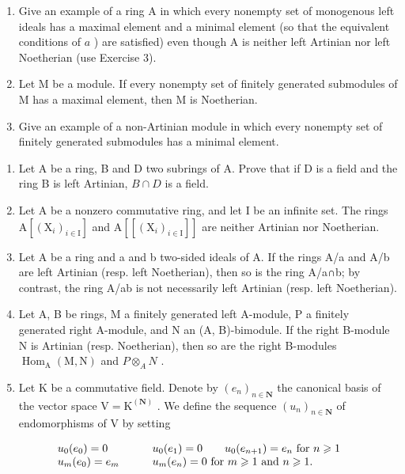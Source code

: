 \begin{enumerate}
\def\labelenumi{\alph{enumi})}
\setcounter{enumi}{1}
\item
  Give an example of a ring A in which every nonempty set of monogenous left ideals has a maximal element and a minimal element (so that the equivalent conditions of \(a\) ) are satisfied) even though A is neither left Artinian nor left Noetherian (use Exercise 3).
\item
  Let M be a module. If every nonempty set of finitely generated submodules of M has a maximal element, then M is Noetherian.
\item
  Give an example of a non-Artinian module in which every nonempty set of finitely generated submodules has a minimal element.
\end{enumerate}

\begin{enumerate}
\def\labelenumi{\arabic{enumi})}
\setcounter{enumi}{7}
\item
  Let A be a ring, B and D two subrings of A. Prove that if D is a field and the ring B is left Artinian, \(B \cap D\) is a field.
\item
  Let A be a nonzero commutative ring, and let I be an infinite set. The rings \(\mathrm{A}[(\mathrm{X}_{i})_{i\in\mathrm{I}}]\) and \(\mathrm{A}[[(\mathrm{X}_{i})_{i\in\mathrm{I}}]]\) are neither Artinian nor Noetherian.
\item
  Let A be a ring and a and b two-sided ideals of A. If the rings A/a and A/b are left Artinian (resp. left Noetherian), then so is the ring A/a∩b; by contrast, the ring A/ab is not necessarily left Artinian (resp. left Noetherian).
\item
  Let A, B be rings, M a finitely generated left A-module, P a finitely generated right A-module, and N an (A, B)-bimodule. If the right B-module N is Artinian (resp. Noetherian), then so are the right B-modules \(\operatorname{Hom}_{\mathrm{A}}(\mathrm{M}, \mathrm{N})\) and \(P \otimes_{A} N\) .
\item
  Let \(\mathrm{K}\) be a commutative field. Denote by \((e_n)_{n\in \mathbf{N}}\) the canonical basis of the vector space \(\mathrm{V} = \mathrm{K}^{(\mathbf{N})}\) . We define the sequence \((u_n)_{n\in \mathbf{N}}\) of endomorphisms of \(\mathrm{V}\) by setting
\end{enumerate}

\[
\begin{array}{l l} u _ {0} (e _ {0}) = 0 & \qquad u _ {0} (e _ {1}) = 0 \qquad u _ {0} (e _ {n + 1}) = e _ {n} \text { for } n \geqslant 1 \\ u _ {m} (e _ {0}) = e _ {m} & \qquad u _ {m} (e _ {n}) = 0 \text { for } m \geqslant 1 \text { and } n \geqslant 1. \end{array}
\]

